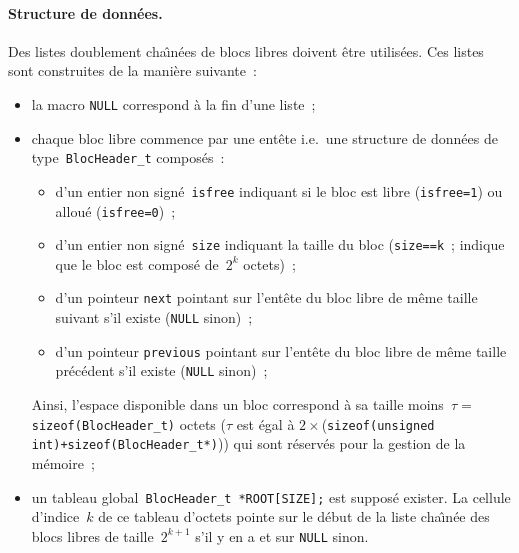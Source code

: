 \paragraph{Structure de donn\'ees.}
Des listes doublement cha\^\i{}n\'ees de blocs libres doivent \^etre
utilis\'ees. Ces listes sont construites de la mani\`ere suivante~:
\begin{itemize}
\item la macro \verb+NULL+ correspond \`a la fin d'une liste~;
\item chaque bloc libre commence par une ent\^ete i.e.\ une structure de donn\'ees de
  type~\verb+BlocHeader_t+ compos\'es~:
  \begin{itemize}
  \item d'un entier non sign\'e~\verb+isfree+ indiquant si le bloc est
    libre (\verb+isfree=1+) ou allou\'e (\verb+isfree=0+)~;
  \item d'un entier non sign\'e~\verb+size+ indiquant la taille du
    bloc (\verb+size==k+~; indique que le bloc est compos\'e de~$2^k$
    octets)~;
  \item d'un pointeur \verb+next+ pointant sur l'ent\^ete du bloc libre de
    m\^eme taille suivant  s'il existe (\verb+NULL+ sinon)~;
  \item d'un pointeur \verb+previous+ pointant sur l'ent\^ete du bloc libre de
    m\^eme taille pr\'ec\'edent s'il existe (\verb+NULL+ sinon)~;
  \end{itemize}
  Ainsi, l'espace disponible dans un bloc correspond \`a sa taille
  moins~${\tau=}$\verb+sizeof(BlocHeader_t)+ octets ($\tau$ est \'egal
  \`a $2\times$(\verb?sizeof(unsigned int)+sizeof(BlocHeader_t*)?)) qui sont
  r\'eserv\'es pour la gestion de la m\'emoire~;
\item un tableau global~\verb+BlocHeader_t *ROOT[SIZE];+ est
  suppos\'e exister. La cellule d'indice~$k$ de ce tableau
  d'octets pointe sur le d\'ebut de la liste cha\^\i{}n\'ee des blocs
  libres de taille~$2^{k+1}$ s'il y en a et sur \verb+NULL+ sinon.
\end{itemize}

